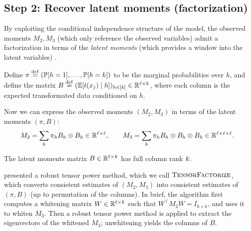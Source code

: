 \subsection{Step 2: Recover latent moments (factorization)}

By exploiting the conditional independence structure of the model, the observed
moments $M_2,M_3$ (which only reference the observed variables) admit a
factorization in terms of the \emph{latent moments}
(which provides a window into the latent variables) \cite{anandkumar12moments}.

Define
$\pi \stackrel{\rm def}{=} (\mathbb{P}[h=1], \dots, \mathbb{P}[h=k])$ to be the marginal probabilities
over $h$,
and define the matrix $B \stackrel{\rm def}{=} (\mathbb{E}[t(x_j) \mid h])_{h \in [k]} \in \mathbb{R}^{\ell \times k}$,
where each column is the expected transformated data conditioned on $h$.

Now we can express the observed moments $(M_2,M_3)$ in terms of the latent moments $(\pi,B)$:
\begin{align}
  M_2 = \sum_h \pi_h B_h \otimes B_h \in \mathbb{R}^{\ell \times \ell}, \quad\quad
  M_3 = \sum_h \pi_h B_h \otimes B_h \otimes B_h \in \mathbb{R}^{\ell \times \ell \times \ell}.
\end{align}
\begin{assumption}
  The latent moments matrix $B \in \mathbb{R}^{\ell \times k}$ has full column rank $k$.
\end{assumption}

\citep{anandkumar13tensor} presented a robust tensor power method, which we call $\text{\sc TensorFactorize}$,
which converts consistent estimates of $(M_2,M_3)$ into consistent estimates of $(\pi, B)$ (up to permutation of the columns).
In brief, the algorithm first computes a whitening matrix $W \in \mathbb{R}^{\ell \times k}$ such that $W^\top M_2 W = I_{k \times k}$,
and uses it to whiten $M_3$.  Then a robust tensor power method is applied to
extract the eigenvectors of the whitened $M_3$;
unwhitening yields the columns of $B$.

